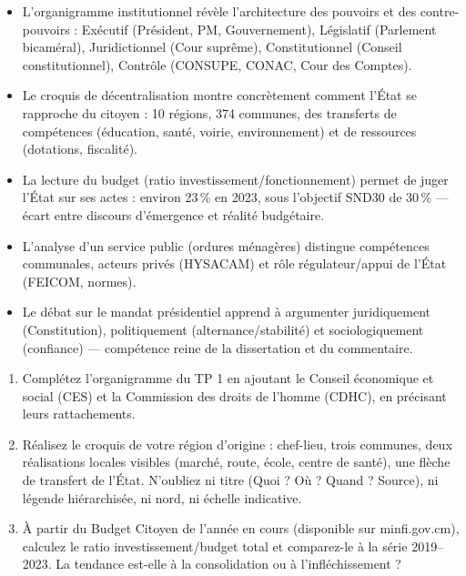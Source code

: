 \documentclass[11pt]{article}
\begin{document}
\begin{aretenir}
\begin{itemize}
\item L'organigramme institutionnel révèle l'architecture des pouvoirs et des contre-pouvoirs : Exécutif (Président, PM, Gouvernement), Législatif (Parlement bicaméral), Juridictionnel (Cour suprême), Constitutionnel (Conseil constitutionnel), Contrôle (CONSUPE, CONAC, Cour des Comptes).
\item Le croquis de décentralisation montre concrètement comment l'État se rapproche du citoyen : 10 régions, 374 communes, des transferts de compétences (éducation, santé, voirie, environnement) et de ressources (dotations, fiscalité).
\item La lecture du budget (ratio investissement/fonctionnement) permet de juger l'État sur ses actes : environ 23\,\% en 2023, sous l'objectif SND30 de 30\,\% — écart entre discours d'émergence et réalité budgétaire.
\item L'analyse d'un service public (ordures ménagères) distingue compétences communales, acteurs privés (HYSACAM) et rôle régulateur/appui de l'État (FEICOM, normes).
\item Le débat sur le mandat présidentiel apprend à argumenter juridiquement (Constitution), politiquement (alternance/stabilité) et sociologiquement (confiance) — compétence reine de la dissertation et du commentaire.
\end{itemize}
\end{aretenir}

\begin{exercice}
\begin{enumerate}
\item Complétez l'organigramme du TP 1 en ajoutant le Conseil économique et social (CES) et la Commission des droits de l'homme (CDHC), en précisant leurs rattachements.
\item Réalisez le croquis de votre région d'origine : chef-lieu, trois communes, deux réalisations locales visibles (marché, route, école, centre de santé), une flèche de transfert de l'État. N'oubliez ni titre (Quoi ? Où ? Quand ? Source), ni légende hiérarchisée, ni nord, ni échelle indicative.
\item À partir du Budget Citoyen de l'année en cours (disponible sur minfi.gov.cm), calculez le ratio investissement/budget total et comparez-le à la série 2019--2023. La tendance est-elle à la consolidation ou à l'infléchissement ?
\end{enumerate}
\end{exercice}
\end{document}
